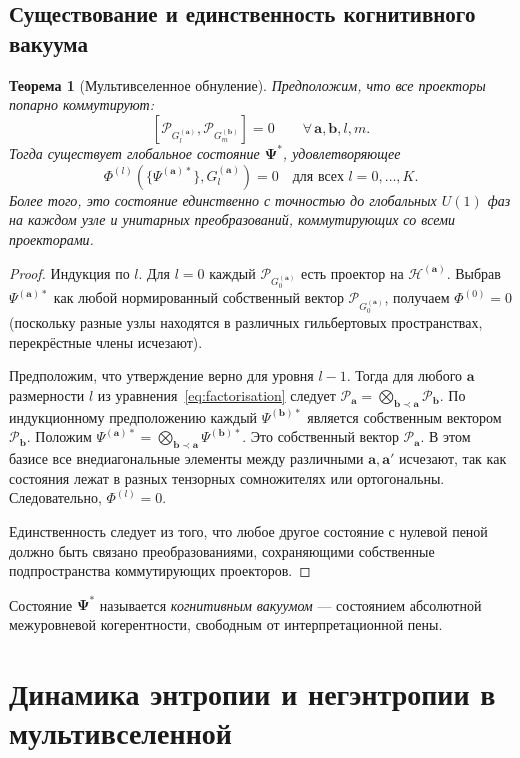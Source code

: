 \documentclass[11pt]{article}
\newtheorem{theorem}{Теорема}[section]
\newcommand{\cP}{\mathcal{P}}
\newcommand{\cH}{\mathcal{H}}
\begin{document}
\subsection{Существование и единственность когнитивного вакуума}
\begin{theorem}[Мультивселенное обнуление]
Предположим, что все проекторы попарно коммутируют:
\[
[\cP_{G_l^{(\mathbf{a})}}, \cP_{G_m^{(\mathbf{b})}}] = 0 \qquad \forall\, \mathbf{a},\mathbf{b}, l,m.
\]
Тогда существует глобальное состояние $\mathbf{\Psi}^*$, удовлетворяющее
\[
\Phi^{(l)}(\{\Psi^{(\mathbf{a})*}\}, G_l^{(\mathbf{a})}) = 0 \quad \text{для всех } l=0,\dots,K.
\]
Более того, это состояние единственно с точностью до глобальных $U(1)$ фаз на каждом узле и унитарных преобразований, коммутирующих со всеми проекторами.
\label{thm:nulling}
\end{theorem}
\begin{proof}
Индукция по $l$. Для $l=0$ каждый $\cP_{G_0^{(\mathbf{a})}}$ есть проектор на $\cH^{(\mathbf{a})}$. Выбрав $\Psi^{(\mathbf{a})*}$ как любой нормированный собственный вектор $\cP_{G_0^{(\mathbf{a})}}$, получаем $\Phi^{(0)}=0$ (поскольку разные узлы находятся в различных гильбертовых пространствах, перекрёстные члены исчезают).

Предположим, что утверждение верно для уровня $l-1$. Тогда для любого $\mathbf{a}$ размерности $l$ из уравнения~\eqref{eq:factorisation} следует $\cP_{\mathbf{a}} = \bigotimes_{\mathbf{b} \prec \mathbf{a}} \cP_{\mathbf{b}}$. По индукционному предположению каждый $\Psi^{(\mathbf{b})*}$ является собственным вектором $\cP_{\mathbf{b}}$. Положим $\Psi^{(\mathbf{a})*} = \bigotimes_{\mathbf{b} \prec \mathbf{a}} \Psi^{(\mathbf{b})*}$. Это собственный вектор $\cP_{\mathbf{a}}$. В этом базисе все внедиагональные элементы между различными $\mathbf{a},\mathbf{a}'$ исчезают, так как состояния лежат в разных тензорных сомножителях или ортогональны. Следовательно, $\Phi^{(l)}=0$.

Единственность следует из того, что любое другое состояние с нулевой пеной должно быть связано преобразованиями, сохраняющими собственные подпространства коммутирующих проекторов.
\end{proof}

Состояние $\mathbf{\Psi}^*$ называется \emph{когнитивным вакуумом} --- состоянием абсолютной межуровневой когерентности, свободным от интерпретационной пены.

\section{Динамика энтропии и негэнтропии в мультивселенной}
\label{sec:entropy}
\end{document}
